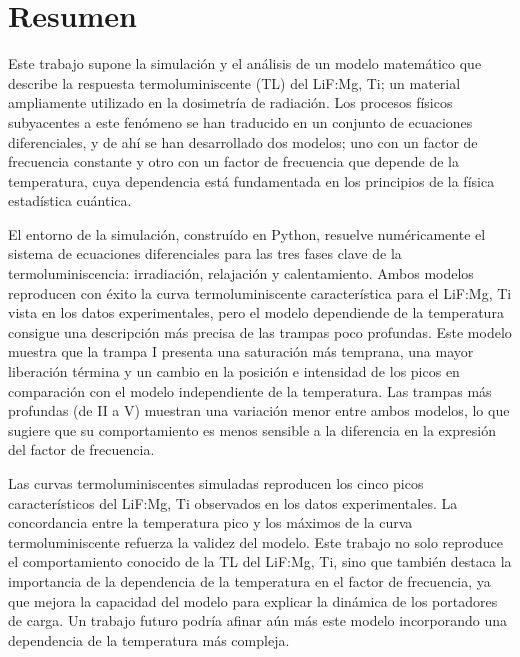 \chapter*{Resumen}

Este trabajo supone la simulación y el análisis de un modelo matemático que describe la respuesta termoluminiscente (TL) del LiF:Mg, Ti; un material ampliamente utilizado en la dosimetría de radiación. Los procesos físicos subyacentes a este fenómeno se han traducido en un conjunto de ecuaciones diferenciales, y de ahí se han desarrollado dos modelos; uno con un factor de frecuencia constante y otro con un factor de frecuencia que depende de la temperatura, cuya dependencia está fundamentada en los principios de la física estadística cuántica.

\vspace{10pt}

El entorno de la simulación, construído en Python, resuelve numéricamente el sistema de ecuaciones diferenciales para las tres fases clave de la termoluminiscencia: irradiación, relajación y calentamiento. Ambos modelos reproducen con éxito la curva termoluminiscente característica para el LiF:Mg, Ti vista en los datos experimentales, pero el modelo dependiende de la temperatura consigue una descripción más precisa de las trampas poco profundas. Este modelo muestra que la trampa I presenta una saturación más temprana, una mayor liberación términa y un cambio en la posición e intensidad de los picos en comparación con el modelo independiente de la temperatura. Las trampas más profundas (de II a V) muestran una variación menor entre ambos modelos, lo que sugiere que su comportamiento es menos sensible a la diferencia en la expresión del factor de frecuencia.

\vspace{10pt}

Las curvas termoluminiscentes simuladas reproducen los cinco picos característicos del LiF:Mg, Ti observados en los datos experimentales. La concordancia entre la temperatura pico y los máximos de la curva termoluminiscente refuerza la validez del modelo. Este trabajo no solo reproduce el comportamiento conocido de la TL del LiF:Mg, Ti, sino que también destaca la importancia de la dependencia de la temperatura en el factor de frecuencia, ya que mejora la capacidad del modelo para explicar la dinámica de los portadores de carga. Un trabajo futuro podría afinar aún más este modelo incorporando una dependencia de la temperatura más compleja.


